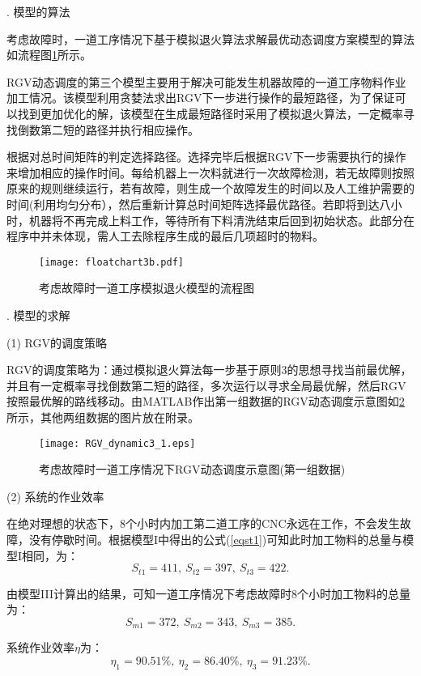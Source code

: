\documentclass[no-math,withoutpreface,bwprint]{cumcmthesis} %
\numberwithin{equation}{section}
\numberwithin{figure}{section}
\numberwithin{table}{section}
\begin{document}
. 模型的算法

考虑故障时，一道工序情况下基于模拟退火算法求解最优动态调度方案模型的算法如流程图\ref{pro3}所示。

RGV动态调度的第三个模型主要用于解决可能发生机器故障的一道工序物料作业加工情况。该模型利用贪婪法求出RGV下一步进行操作的最短路径，为了保证可以找到更加优化的解，该模型在生成最短路径时采用了模拟退火算法，一定概率寻找倒数第二短的路径并执行相应操作。

根据对总时间矩阵的判定选择路径。选择完毕后根据RGV下一步需要执行的操作来增加相应的操作时间。每给机器上一次料就进行一次故障检测，若无故障则按照原来的规则继续运行，若有故障，则生成一个故障发生的时间以及人工维护需要的时间(利用均匀分布），然后重新计算总时间矩阵选择最优路径。若即将到达八小时，机器将不再完成上料工作，等待所有下料清洗结束后回到初始状态。此部分在程序中并未体现，需人工去除程序生成的最后几项超时的物料。

\begin{figure}[!htbp]
	\vspace{-1.3cm}
	\hspace{-1.5cm}
	\texttt{[image: floatchart3b.pdf]}
	\caption{考虑故障时一道工序模拟退火模型的流程图}
     \label{pro3}
\end{figure}

. 模型的求解

\noindent(1) RGV的调度策略

RGV的调度策略为：通过模拟退火算法每一步基于原则3的思想寻找当前最优解，并且有一定概率寻找倒数第二短的路径，多次运行以寻求全局最优解，然后RGV按照最优解的路线移动。由MATLAB作出第一组数据的RGV动态调度示意图如\ref{figdy3}所示，其他两组数据的图片放在附录。

\begin{figure}[!htbp]
	\hspace{-0.5cm}
	\texttt{[image: RGV\_dynamic3\_1.eps]}
	\caption{考虑故障时一道工序情况下RGV动态调度示意图(第一组数据)}
     \label{figdy3}
\end{figure}

\noindent(2) 系统的作业效率

在绝对理想的状态下，8个小时内加工第二道工序的CNC永远在工作，不会发生故障，没有停歇时间。根据模型I中得出的公式(\ref{eqst1})可知此时加工物料的总量与模型I相同，为：
$$S_{t1}=411,
\ S_{t2}=397,
\ S_{t3}=422.$$

由模型III计算出的结果，可知一道工序情况下考虑故障时8个小时加工物料的总量为：$$S_{m1}=372,\ S_{m2}=343,\ S_{m3}=385.$$

系统作业效率$\eta$为：
$$\eta_1=90.51\%,\ \eta_2=86.40\%,\ \eta_3=91.23\%.$$
\end{document}
